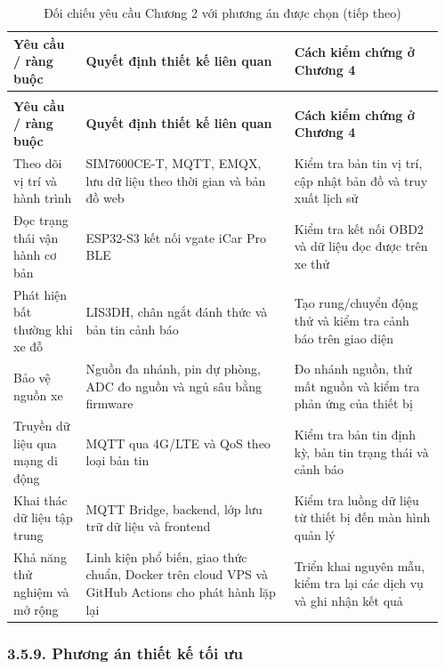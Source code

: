 \documentclass[a4paper]{extarticle}
\newcommand{\thesissettableid}[2]{%
  \renewcommand{\thetable}{#1}%
  \renewcommand{\theHtable}{#2}%
}
\begin{document}
{\thesissettableid{3.44}{condensed-bang-3-44-doi-chieu-yeu-cau-chuong-2-voi-phuong-an-duoc-chon}
\def\LTcaptype{table}
\begin{longtable}{|L{0.161\linewidth}|L{0.462\linewidth}|L{0.335\linewidth}|}
\caption{Đối chiếu yêu cầu Chương 2 với phương án được chọn}\label{tab:condensed-bang-3-44-doi-chieu-yeu-cau-chuong-2-voi-phuong-an-duoc-chon}\\
\hline
\textbf{Yêu cầu / ràng buộc} & \textbf{Quyết định thiết kế liên quan} & \textbf{Cách kiểm chứng ở Chương 4} \\
\hline
\endfirsthead
\caption[]{Đối chiếu yêu cầu Chương 2 với phương án được chọn (tiếp theo)}\\
\hline
\textbf{Yêu cầu / ràng buộc} & \textbf{Quyết định thiết kế liên quan} & \textbf{Cách kiểm chứng ở Chương 4} \\
\hline
\endhead
\endfoot
\endlastfoot
Theo dõi vị trí và hành trình & SIM7600CE-T, MQTT, EMQX, lưu dữ liệu theo thời gian và bản đồ web & Kiểm tra bản tin vị trí, cập nhật bản đồ và truy xuất lịch sử \\\hline
Đọc trạng thái vận hành cơ bản & ESP32-S3 kết nối vgate iCar Pro BLE & Kiểm tra kết nối OBD2 và dữ liệu đọc được trên xe thử \\\hline
Phát hiện bất thường khi xe đỗ & LIS3DH, chân ngắt đánh thức và bản tin cảnh báo & Tạo rung/chuyển động thử và kiểm tra cảnh báo trên giao diện \\\hline
Bảo vệ nguồn xe & Nguồn đa nhánh, pin dự phòng, ADC đo nguồn và ngủ sâu bằng firmware & Đo nhánh nguồn, thử mất nguồn và kiểm tra phản ứng của thiết bị \\\hline
Truyền dữ liệu qua mạng di động & MQTT qua 4G/LTE và QoS theo loại bản tin & Kiểm tra bản tin định kỳ, bản tin trạng thái và cảnh báo \\\hline
Khai thác dữ liệu tập trung & MQTT Bridge, backend, lớp lưu trữ dữ liệu và frontend & Kiểm tra luồng dữ liệu từ thiết bị đến màn hình quản lý \\\hline
Khả năng thử nghiệm và mở rộng & Linh kiện phổ biến, giao thức chuẩn, Docker trên cloud VPS và GitHub Actions cho phát hành lặp lại & Triển khai nguyên mẫu, kiểm tra lại các dịch vụ và ghi nhận kết quả \\\hline
\end{longtable}
}

\subsubsection{3.5.9. Phương án thiết kế tối ưu}\label{phux1b0ux1a1ng-uxe1n-thiux1ebft-kux1ebf-tux1ed1i-ux1b0u}
\end{document}
